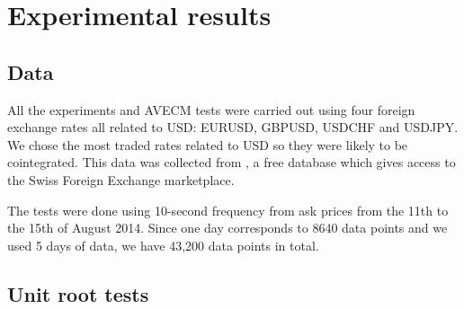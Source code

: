 \section{Experimental results}
\label{sec:51results}
\subsection{Data}
All the experiments and AVECM tests were carried out using four foreign exchange rates all related to
USD: EURUSD, GBPUSD, USDCHF and USDJPY. We chose the most traded rates related
to USD so they were likely to be cointegrated. 
This data was collected from
\cite{Dukascopy2014}, a free database which gives access to the Swiss Foreign
Exchange marketplace.

The tests were done using 10-second frequency from ask prices from the 11th to
the 15th of August 2014. Since one day corresponds to 8640 data points and we
used 5 days of data, we have 43,200 data points in total.

\subsection{Unit root tests}

